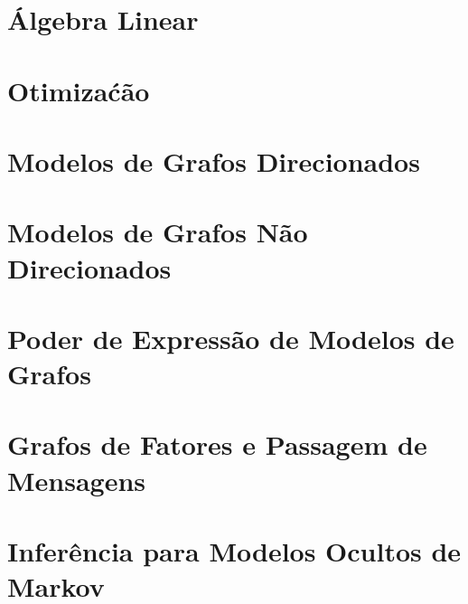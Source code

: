 \documentclass[11pt,a4paper,twoside,openright]{book}
\let\origdoublepage\cleardoublepage
\newcommand{\clearemptydoublepage}{%
  \clearpage
  {\pagestyle{empty}\origdoublepage}%
}
\let\cleardoublepage\clearemptydoublepage
\begin{document}
\frontmatter


\newpage


\dominitoc
\setcounter{tocdepth}{1}    %
\setcounter{secnumdepth}{1} %
\tableofcontents
\cleardoublepage



\mainmatter

\chapter{\'Algebra Linear}
\minitoc
 

\chapter{Otimiza\'c\~ao} 
\minitoc
 

\chapter{Modelos de Grafos Direcionados} 
\minitoc
 

\chapter{Modelos de Grafos N\~ao Direcionados}
\minitoc
 

\chapter{Poder de Express\~ao de Modelos de Grafos}
\minitoc
 

\chapter{Grafos de Fatores e Passagem de Mensagens}
\minitoc
 

\chapter{Infer\^encia para Modelos Ocultos de Markov}
\minitoc
 
\end{document}

